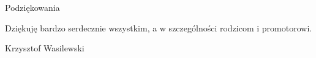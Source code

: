 \noindent
{\Large Podziękowania}
\bigskip

Dziękuję bardzo serdecznie wszystkim, a w szczególności rodzicom i promotorowi.

\bigskip

{\raggedleft
Krzysztof Wasilewski

}

